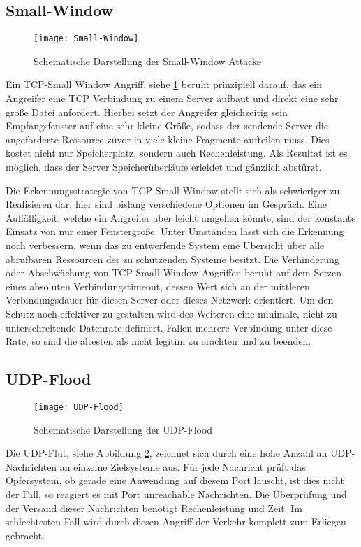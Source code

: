 \documentclass[../review_1.tex]{subfiles}
\begin{document}
\subsection{Small-Window}
\begin{figure}[t]
    \centering
    \texttt{[image: Small-Window]}
    \caption{Schematische Darstellung der Small-Window Attacke}
    \label{fig:Small-Window}
\end{figure}
Ein TCP-Small Window Angriff, siehe \ref{fig:Small-Window} beruht prinzipiell darauf, das  ein Angreifer eine TCP Verbindung zu einem Server aufbaut und direkt eine sehr große Datei anfordert. Hierbei setzt der Angreifer gleichzeitig sein Empfangsfenster auf eine sehr kleine Größe, sodass der sendende Server die angeforderte Ressource zuvor in viele kleine Fragmente aufteilen muss. Dies kostet nicht nur Speicherplatz, sondern auch Rechenleistung. Als Resultat ist es möglich, dass der Server Speicherüberläufe erleidet und gänzlich abstürzt.

Die Erkennungsstrategie von TCP Small Window stellt sich als schwieriger zu Realisieren dar, hier sind bislang verschiedene Optionen im Gespräch. Eine Auffälligkeit, welche ein Angreifer aber leicht umgehen könnte, sind der konstante Einsatz von nur einer Fenstergröße. Unter Umständen lässt sich die Erkennung noch verbessern, wenn das zu entwerfende System eine Übersicht über alle abrufbaren Ressourcen der zu schützenden Systeme besitzt.
Die Verhinderung oder Abschwächung von TCP Small Window Angriffen beruht auf dem Setzen eines absoluten Verbindungstimeout, dessen Wert sich an der mittleren Verbindungsdauer für diesen Server oder dieses Netzwerk orientiert. Um den Schutz noch effektiver zu gestalten wird des Weiteren eine minimale, nicht zu unterschreitende Datenrate definiert. Fallen mehrere Verbindung unter diese Rate, so sind die ältesten als nicht legitim zu erachten und zu beenden.

\subsection{UDP-Flood}
\begin{figure}[t]
    \centering
    \texttt{[image: UDP-Flood]}
    \caption{Schematische Darstellung der UDP-Flood}
    \label{fig:UDP-Flood}
\end{figure}

Die UDP-Flut, siehe Abbildung \ref{fig:UDP-Flood}, zeichnet sich durch eine hohe Anzahl an UDP-Nachrichten an einzelne Zielsysteme aus. Für jede Nachricht prüft das Opfersystem, ob gerade eine Anwendung auf diesem Port lauscht, ist dies nicht der Fall, so reagiert es mit Port unreachable Nachrichten. Die Überprüfung und der Versand dieser Nachrichten benötigt Rechenleistung und Zeit. Im schlechtesten Fall wird durch diesen Angriff der Verkehr komplett zum Erliegen gebracht.
\end{document}
